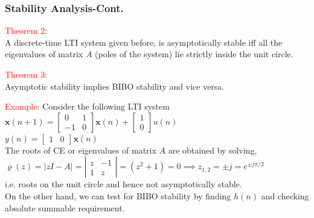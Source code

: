 \documentclass[mathserif, 10pt]{beamer} %
\def\x{\mathbf{x}}
\begin{document}
\frame
{
\normalsize
\frametitle{Stability Analysis-Cont.}

\textcolor{red}{Theorem 2:}\\
A discrete-time LTI system given before, is asymptotically stable iff all the eigenvalues of matrix $A$ (poles of the system)
lie strictly inside the unit circle. \\ \vspace{0.1in}

\textcolor{red}{Theorem 3:}\\
Asymptotic stability implies BIBO stability and vice versa. \\ \vspace{0.15in}


\textcolor{red}{Example:}  Consider the following LTI system \\ \vspace{0.07in}
$\x(n+1) = \left[
\begin{array}{cc}
	0&1\\
	-1&0
\end{array}\right] \x(n)+\left[
\begin{array}{c}
	1\\
	0
\end{array}\right] u(n)$\\
$y(n) = \left[
\begin{array}{cc}
	1&0
\end{array} \right] \x(n)$\\
The roots of CE or eigenvalues of matrix $A$ are obtained by solving,
$\varrho(z) =|zI-A| = \left|
\begin{array}{cc}
 	z&-1\\
	1&z
\end{array} \right| = (z^2+1)=0 \implies z_{1,2} = \pm j = e^{\pm j\pi/2}$\\

i.e. roots on the unit circle and hence not asymptotically stable.  \\
On the other hand, we can test for BIBO stability by finding $h(n)$ and checking absolute summable requirement.

}
\end{document}
